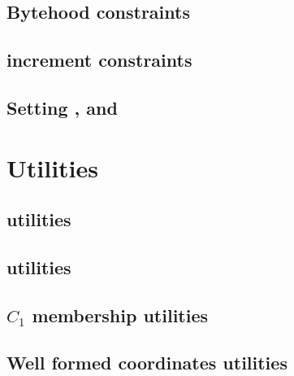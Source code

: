 \subsection{Bytehood constraints}                                           \label{ec data: bytehood and accumulator}                           
\subsection{\ecdataId{} increment constraints}                              \label{ec data: stamp increments}                                   
\subsection{Setting \notOnGTwo{}, \notOnGTwoAcc{} and \notOnGTwoAccMax}     \label{ec data: this point is not on G2 and acc}                    

\section{Utilities}                                                                                                                             
\subsection{\wcpMod{} utilities}                                            \label{ec data: wcp utilities}                                      
\subsection{\extMod{} utilities}                                            \label{ec data: ext utilities}                                      
\subsection{$C_1$ membership utilities}                                     \label{ec data: c1 membership utilities}                            
\subsection{Well formed coordinates utilities}                              \label{ec data: c2 membership maybe utilities}                      


